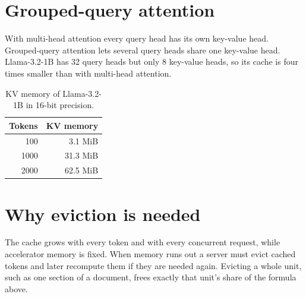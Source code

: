 \documentclass{article}
\begin{document}
\section{Grouped-query attention}
With multi-head attention every query head has its own key-value head. Grouped-query attention lets several query heads share one key-value head.
Llama-3.2-1B has 32 query heads but only 8 key-value heads, so its cache is four times smaller than with multi-head attention.

\begin{table}[h]
\centering
\begin{tabular}{rr}
Tokens & KV memory \\
\hline
100 & 3.1 MiB \\
1000 & 31.3 MiB \\
2000 & 62.5 MiB \\
\end{tabular}
\caption{KV memory of Llama-3.2-1B in 16-bit precision.}
\end{table}

\section{Why eviction is needed}
The cache grows with every token and with every concurrent request, while accelerator memory is fixed.
When memory runs out a server must evict cached tokens and later recompute them if they are needed again.
Evicting a whole unit, such as one section of a document, frees exactly that unit's share of the formula above.
\end{document}
